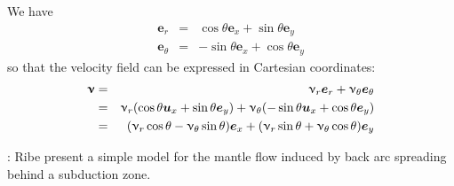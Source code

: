 We have 
\begin{eqnarray}
{\bm e}_r      &=& \cos\theta {\bm e}_x + \sin\theta {\bm e}_y \\
{\bm e}_\theta &=& -\sin\theta {\bm e}_x + \cos\theta {\bm e}_y
\end{eqnarray}
so that the velocity field can be expressed in Cartesian coordinates:
\begin{eqnarray}
{\bm \upnu} 
&=& \upnu_r {\bm e}_r + \upnu_\theta {\bm e}_\theta \nonumber\\
&=& \upnu_r ( \cos\theta {\bm u}_x + \sin\theta {\bm e}_y) + \upnu_\theta (-\sin\theta {\bm u}_x + \cos\theta {\bm e}_y) \nonumber\\
&=& ( \upnu_r \cos\theta - \upnu_\theta \sin\theta  ) {\bm e}_x + ( \upnu_r \sin\theta + \upnu_\theta\cos\theta  ) {\bm e}_y
\end{eqnarray}




\Literature: Ribe \cite{ribe89} present a simple model for the mantle flow induced by back arc spreading behind a subduction zone.



